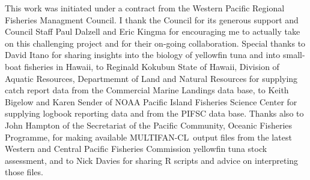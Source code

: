 \documentclass[12pt,letterpaper]{article}
\newcommand\singlespacing{\baselineskip=1.0\normalbaselineskip}
\newcommand\MFCL{MULTIFAN-CL}
\begin{document}
\clearpage
\singlespacing
{}
This work was initiated under a contract from the Western Pacific Regional Fisheries
Managment Council. I thank the Council for its generous support and
Council Staff Paul Dalzell and Eric Kingma for encouraging me to
actually take on this challenging project and for their on-going
collaboration. Special thanks
to David Itano for sharing insights into the biology of yellowfin tuna
and into small-boat fisheries in Hawaii,
to Reginald Kokubun State of Hawaii, Division of Aquatic Resources,
Departmemnt of Land and Natural Resources for supplying catch report
data from the Commercial Marine Landings data base,
to Keith Bigelow and Karen Sender of NOAA Pacific
Island Fisheries Science Center for supplying logbook reporting data and
from the PIFSC data base.
Thanks also to John Hampton of the Secretariat of the Pacific
Community, Oceanic Fisheries Programme, for making available \MFCL\
output files from the latest Western and Central Pacific
Fisheries Commission yellowfin tuna stock assessment, and to Nick
Davies for sharing R scripts and advice on interpreting those files.
\end{document}
